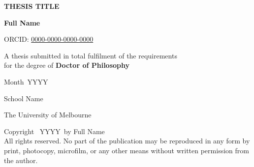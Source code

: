 \documentclass[12pt, a4paper, twoside]{book}
\newcommand{\thesistitle}{Thesis Title}
\newcommand{\thesisauthor}{Full Name}
\newcommand{\orcid}{0000-0000-0000-0000}
\newcommand{\degree}{Doctor of Philosophy}
\newcommand{\submissionmonth}{Month}
\newcommand{\submissionyear}{YYYY}
\newcommand{\school}{School Name}
\begin{document}
\frontmatter
\onehalfspacing


\begin{titlepage}
    \centering
    \vspace*{2cm}

    {\Huge \bfseries \MakeUppercase{\thesistitle}\par}
    \vspace{1.5cm}

    {\Large \textbf{\thesisauthor}\par}
    {\normalsize ORCID: \href{https://orcid.org/\orcid}{\orcid}\par}
    \vspace{3cm}

    {\large A thesis submitted in total fulfilment of the requirements \\ for the degree of \textbf{\degree}\par}
    \vspace{3cm}

    {\large \submissionmonth\ \submissionyear\par}
    \vspace{2cm}

    {\large \school\par}
    {\large The University of Melbourne\par}
    \vfill
\end{titlepage}

\thispagestyle{empty}
\vspace*{\fill}
\begin{center}
Copyright \textcopyright\ \submissionyear\ by \thesisauthor \\
All rights reserved. No part of the publication may be reproduced in any form by print, photocopy, microfilm, or any other means without written permission from the author.
\end{center}
\vfill
\clearpage
\end{document}
